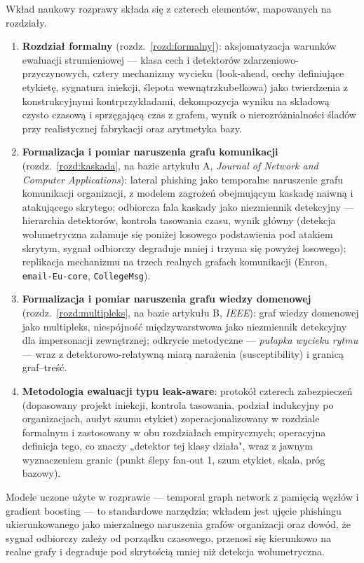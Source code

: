 Wkład naukowy rozprawy składa się z czterech elementów, mapowanych na
rozdziały.

\begin{enumerate}
\item \textbf{Rozdział formalny} (rozdz.~\ref{rozd:formalny}):
aksjomatyzacja warunków ewaluacji strumieniowej --- klasa cech i
detektorów zdarzeniowo-przyczynowych, cztery mechanizmy wycieku
(look-ahead, cechy definiujące etykietę, sygnatura iniekcji, ślepota
wewnątrzkubełkowa) jako twierdzenia z konstrukcyjnymi kontrprzykładami,
dekompozycja wyniku na składową czysto czasową i sprzęgającą czas
z grafem, wynik o nierozróżnialności śladów przy realistycznej
fabrykacji oraz arytmetyka bazy.
\item \textbf{Formalizacja i pomiar naruszenia grafu komunikacji}
(rozdz.~\ref{rozd:kaskada}, na bazie artykułu A, \emph{Journal of
Network and Computer Applications}): lateral phishing jako temporalne
naruszenie grafu komunikacji organizacji, z modelem zagrożeń obejmującym
kaskadę naiwną i atakującego skrytego; odbiorcza fala kaskady jako
niezmiennik detekcyjny --- hierarchia detektorów, kontrola tasowania
czasu, wynik główny (detekcja wolumetryczna załamuje się poniżej losowego
podstawienia pod atakiem skrytym, sygnał odbiorczy degraduje mniej
i trzyma się powyżej losowego); replikacja mechanizmu na trzech realnych
grafach komunikacji (Enron, \texttt{email-Eu-core}, \texttt{CollegeMsg}).
\item \textbf{Formalizacja i pomiar naruszenia grafu wiedzy domenowej}
(rozdz.~\ref{rozd:multipleks}, na bazie
artykułu B, \emph{IEEE}): graf wiedzy domenowej jako multipleks,
niespójność międzywarstwowa jako niezmiennik detekcyjny dla
impersonacji zewnętrznej; odkrycie metodyczne --- \emph{pułapka wycieku
rytmu} --- wraz z detektorowo-relatywną miarą narażenia
(susceptibility) i granicą graf--treść.
\item \textbf{Metodologia ewaluacji typu leak-aware}: protokół
czterech zabezpieczeń (dopasowany projekt iniekcji, kontrola
tasowania, podział indukcyjny po organizacjach, audyt szumu etykiet)
zoperacjonalizowany w rozdziale formalnym i zastosowany w obu
rozdziałach empirycznych; operacyjna definicja tego, co znaczy „detektor
tej klasy działa", wraz z jawnym wyznaczeniem granic (punkt ślepy
fan-out 1, szum etykiet, skala, próg bazowy).
\end{enumerate}

Modele uczone użyte w rozprawie --- temporal graph network z pamięcią
węzłów i gradient boosting --- to standardowe narzędzia; wkładem jest
ujęcie phishingu ukierunkowanego jako mierzalnego naruszenia grafów
organizacji oraz dowód, że sygnał odbiorczy zależy od porządku
czasowego, przenosi się kierunkowo na realne grafy i degraduje pod
skrytością mniej niż detekcja wolumetryczna.

